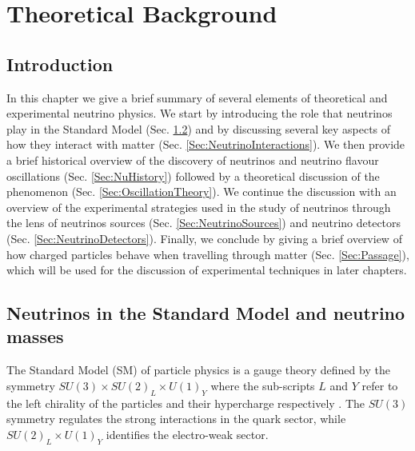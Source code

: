 


\chapter{\label{ch:2-litreview}Theoretical Background}
\minitoc
\section{Introduction}
 In this chapter we give a brief summary of several elements of theoretical and experimental neutrino physics. We start by introducing the role that neutrinos play in the Standard Model (Sec. \ref{Sec:SMNeutrinos}) and by discussing several key aspects of how they interact with matter (Sec. \ref{Sec:NeutrinoInteractions}). We then provide a brief historical overview of the discovery of neutrinos and neutrino flavour oscillations (Sec. \ref{Sec:NuHistory}) followed by a theoretical discussion of the phenomenon (Sec. \ref{Sec:OscillationTheory}). We continue the discussion with an overview of the experimental strategies used in the study of neutrinos through the lens of neutrinos sources (Sec. \ref{Sec:NeutrinoSources}) and neutrino detectors (Sec. \ref{Sec:NeutrinoDetectors}). Finally, we conclude by giving a brief overview of how charged particles behave when travelling through matter (Sec. \ref{Sec:Passage}), which will be used for the discussion of experimental techniques in later chapters. 


\section{Neutrinos in the Standard Model and neutrino masses}
\label{Sec:SMNeutrinos}
The Standard Model (SM) of particle physics is a gauge theory defined by the symmetry $SU(3)\times SU(2)_L \times U(1)_Y$ where the sub-scripts $L$ and $Y$ refer to the left chirality of the particles and their hypercharge respectively \cite{Thomson_2013}. The $SU(3)$ symmetry regulates the strong interactions in the quark sector, while $SU(2)_L\times U(1)_Y$ identifies the electro-weak sector.

